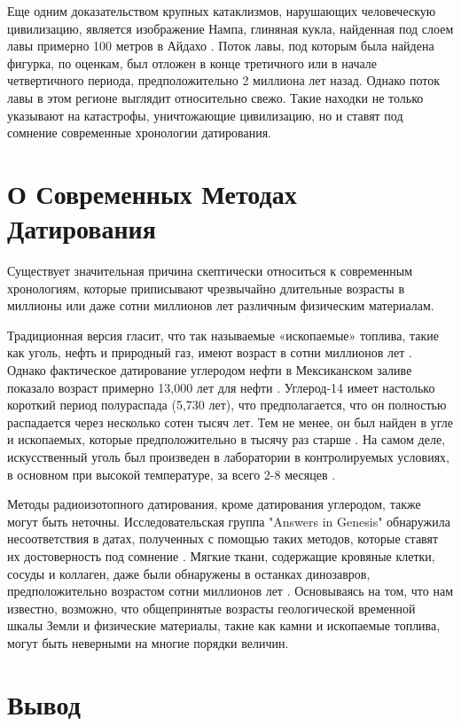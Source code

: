\documentclass[10pt,twocolumn,letterpaper]{article}
\begin{document}
Еще одним доказательством крупных катаклизмов, нарушающих человеческую цивилизацию, является изображение Нампа, глиняная кукла, найденная под слоем лавы примерно 100 метров в Айдахо \cite{102,103}. Поток лавы, под которым была найдена фигурка, по оценкам, был отложен в конце третичного или в начале четвертичного периода, предположительно 2 миллиона лет назад. Однако поток лавы в этом регионе выглядит относительно свежо. Такие находки не только указывают на катастрофы, уничтожающие цивилизацию, но и ставят под сомнение современные хронологии датирования.

\section{О Современных Методах Датирования}

Существует значительная причина скептически относиться к современным хронологиям, которые приписывают чрезвычайно длительные возрасты в миллионы или даже сотни миллионов лет различным физическим материалам.

Традиционная версия гласит, что так называемые «ископаемые» топлива, такие как уголь, нефть и природный газ, имеют возраст в сотни миллионов лет \cite{104}. Однако фактическое датирование углеродом нефти в Мексиканском заливе показало возраст примерно 13,000 лет для нефти \cite{105}. Углерод-14 имеет настолько короткий период полураспада (5,730 лет), что предполагается, что он полностью распадается через несколько сотен тысяч лет. Тем не менее, он был найден в угле и ископаемых, которые предположительно в тысячу раз старше \cite{106}. На самом деле, искусственный уголь был произведен в лаборатории в контролируемых условиях, в основном при высокой температуре, за всего 2-8 месяцев \cite{107}.

Методы радиоизотопного датирования, кроме датирования углеродом, также могут быть неточны. Исследовательская группа "Answers in Genesis" обнаружила несоответствия в датах, полученных с помощью таких методов, которые ставят их достоверность под сомнение \cite{108}. Мягкие ткани, содержащие кровяные клетки, сосуды и коллаген, даже были обнаружены в останках динозавров, предположительно возрастом сотни миллионов лет \cite{109,110}. Основываясь на том, что нам известно, возможно, что общепринятые возрасты геологической временной шкалы Земли и физические материалы, такие как камни и ископаемые топлива, могут быть неверными на многие порядки величин.

\section{Вывод}
\end{document}
